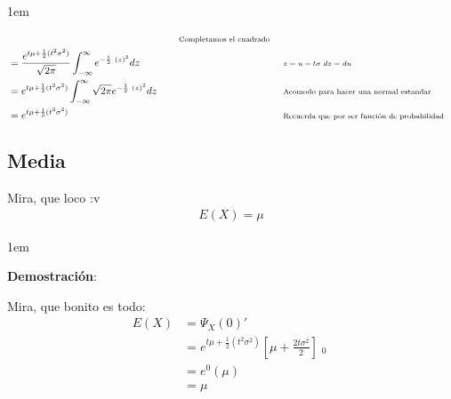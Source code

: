 \documentclass[12pt, fleqn]{report}                             %
\newenvironment{SmallIndentation}[1][0.75em]                    %
        {\begin{adjustwidth}{#1}{}\begin{footnotesize}}             %
        {\end{footnotesize}\end{adjustwidth}}                       %
\DeclareMathOperator \Space {\quad}                             %
\newcommand \Remember[1]{\Space\text{\scriptsize{#1}}}          %
\theoremstyle{break}                                            %
\newcommand{\Brackets}[1]{\left[ #1 \right]}                    %
\newcommand{\Wrap}[1]{\left( #1 \right)}                        %
\DeclareMathOperator \Evaluate  {\Big|}                         %
\begin{document}
\begin{SmallIndentation}[1em]
\begin{align*}
                                && \Remember{Completamos el cuadrado}                               \\
                            &= \dfrac{e^{t\mu + \frac{1}{2}(t^2\sigma^2)}}{\sqrt{2\pi}}
                                    \int_{-\infty}^\infty 
                                        e^{-\frac{1}{2} \
                                            \Wrap{z}^2
                                        } dz
                                && \Remember{$z = u - t\sigma$ $dz=du$}                             \\
                            &= e^{t\mu + \frac{1}{2}(t^2\sigma^2)}
                                \int_{-\infty}^\infty 
                                    {\sqrt{2\pi}}
                                        e^{-\frac{1}{2} \
                                            \Wrap{z}^2
                                        } dz
                                && \Remember{Acomodo para hacer una normal estandar}                \\
                            &= e^{t\mu + \frac{1}{2}(t^2\sigma^2)}
                                && \Remember{Recuerda que por ser función de probabilidad}
                    \end{align*}
                
                \end{SmallIndentation}


            \clearpage
            \subsection{Media}

                Mira, que loco :v
                \begin{align*}
                    E(X) = \mu
                \end{align*}

                \begin{SmallIndentation}[1em]
                    \textbf{Demostración}:
                    
                    Mira, que bonito es todo:
                    \begin{align*}
                        E(X)
                            &= \Psi_X(0)'                                           \\
                            &= e^{t\mu + \frac{1}{2}(t^2\sigma^2)} 
                                \Brackets{\mu + \frac{2t\sigma^2}{2}} \Evaluate_0   \\
                            &= e^0 (\mu)                                            \\
                            &= \mu
                    \end{align*}
                
                \end{SmallIndentation}
                    
\end{document}
